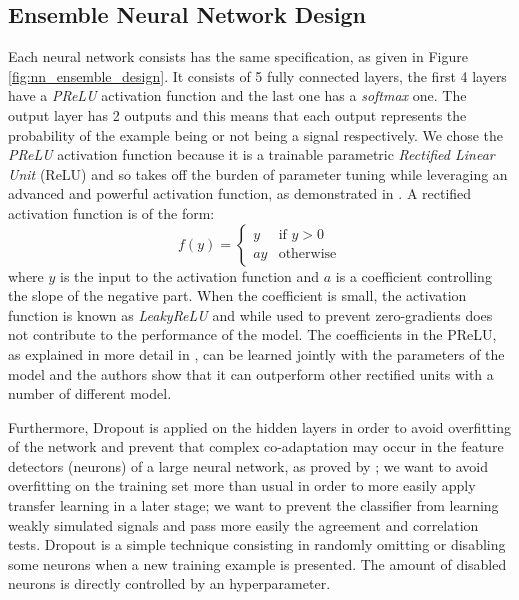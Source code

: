 \documentclass[conference]{IEEEtran}
\begin{document}
\subsection{Ensemble Neural Network Design}
\label{sec:NN_design}
Each neural network consists has the same specification, as given in Figure
\ref{fig:nn_ensemble_design}. It consists of 5 fully connected layers, the first
4 layers have a \textit{PReLU} activation function and the last one has a
\textit{softmax} one. The output layer has 2 outputs and this means that each
output represents the probability of the example being or not being a signal
respectively. We chose the \textit{PReLU} activation function because it is a
trainable parametric \textit{Rectified Linear Unit} (ReLU)  and so takes off the
burden of parameter tuning while leveraging an advanced and powerful activation
function, as demonstrated in \cite{he2015delving}. A rectified activation
function is of the form:
\begin{equation}
	f(y) = \begin{cases} y & \text{if } y > 0 \\ ay & \text{otherwise} \end{cases}
	\label{eq:relu}
\end{equation}
where $y$ is the input to the activation function and $a$ is a coefficient
controlling the slope of the negative part. When the coefficient is small, the
activation function is known as \textit{LeakyReLU} and while used to prevent
zero-gradients does not contribute to the performance of the model. The
coefficients in the PReLU, as explained in more detail in \cite{he2015delving},
can be learned jointly with the parameters of the model and the authors show
that it can outperform other rectified units with a number of different model.

Furthermore, Dropout is applied on the hidden layers in order to avoid
overfitting of the network and prevent that complex co-adaptation may occur in
the feature detectors (neurons) of a large neural network, as proved by
\cite{srivastava2014dropout, hinton2012improving}; we want to avoid overfitting
on the training set more than usual in order to more easily apply transfer
learning in a later stage; we want to prevent the classifier from learning
weakly simulated signals and pass more easily the agreement and correlation
tests. Dropout is a simple technique consisting in randomly omitting or
disabling some neurons when a new training example is presented. The amount of
disabled neurons is directly controlled by an hyperparameter.
\end{document}
